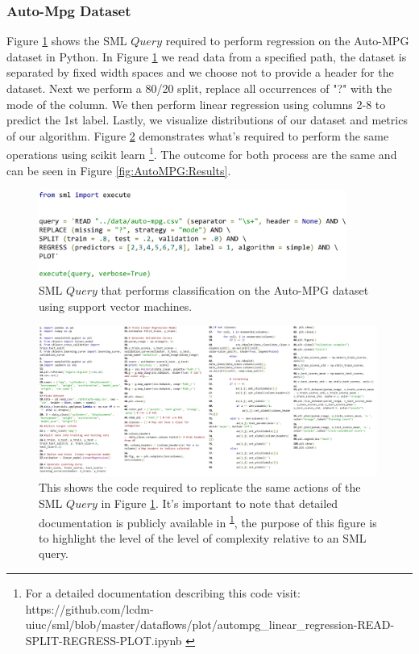\documentclass[jair,twoside,11pt,theapa]{article}
\begin{document}
\subsubsection{Auto-Mpg Dataset}
Figure \ref{fig:SML:AutoMPGQuery} shows the SML \(Query\) required to perform regression on the Auto-MPG dataset in Python. In Figure \ref{fig:SML:AutoMPGQuery} we read data from a specified path, the dataset is separated by fixed width spaces and we choose not to provide a header for the dataset.  Next we perform a 80/20 split, replace all occurrences of "?" with the mode of the column. We then perform linear regression using columns 2-8 to predict the 1st label. Lastly, we visualize distributions of our dataset and metrics of our algorithm. Figure \ref{fig:Manual:Auto-MPG} demonstrates what's required to perform the same operations using scikit learn \footnote{For a detailed documentation describing this code visit: https://github.com/lcdm-uiuc/sml/blob/master/dataflows/plot/autompg\_linear\_regression-READ-SPLIT-REGRESS-PLOT.ipynb \label{lab:SML:AUTO}}. The outcome for both process are the same and can be seen in Figure \ref{fig:AutoMPG:Results}.

\begin{figure}
\includegraphics[width=0.9\textwidth]{figs/autompg_sml.png}
\centering
\caption{SML \(Query\) that performs classification on the Auto-MPG dataset using support vector machines.}
\label{fig:SML:AutoMPGQuery}
\end{figure}

\begin{figure}
\includegraphics[width=0.99\textwidth]{figs/auto-mpg_manual.png}
\centering
\caption{This shows the code required to replicate the same actions of the SML \(Query\) in Figure \ref{fig:SML:AutoMPGQuery}. It's important to note that detailed documentation is publicly available in \textsuperscript{\ref{lab:SML:AUTO}}, the purpose of this figure is to highlight the level of the level of complexity relative to an SML query.}
\label{fig:Manual:Auto-MPG}
\end{figure}
\end{document}
